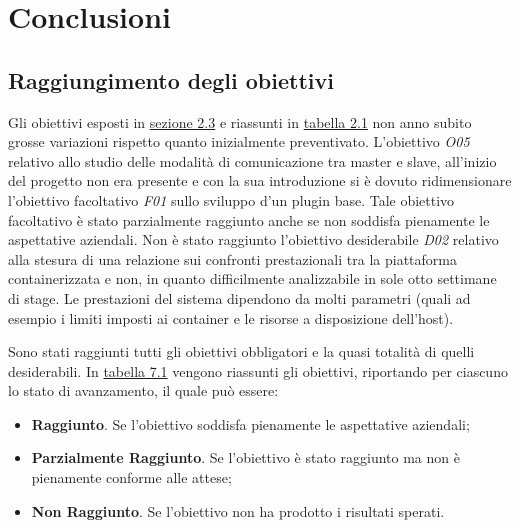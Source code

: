 
\pagestyle{IHA-fancy-style}
\chapter{Conclusioni}
\label{cap:conclusioni}


\section{Raggiungimento degli obiettivi}
\label{sec:obiettivi-raggiunti}

Gli obiettivi esposti in \hyperref[sec:ob]{sezione 2.3} e riassunti in \hyperref[tab:obiettivi-iniziali]{tabella 2.1} non anno subito grosse variazioni rispetto quanto inizialmente preventivato. L'obiettivo \textit{O05} relativo allo studio delle modalità di comunicazione tra \gls{master} e \gls{slave}, all'inizio del progetto non era presente e con la sua introduzione si è dovuto ridimensionare l'obiettivo facoltativo \textit{F01} sullo sviluppo d'un \gls{plugin} base. Tale obiettivo facoltativo è stato parzialmente raggiunto anche se non soddisfa pienamente le aspettative aziendali. Non è stato raggiunto l'obiettivo desiderabile \textit{D02} relativo alla stesura di una relazione sui confronti prestazionali tra la piattaforma containerizzata e non, in quanto difficilmente analizzabile in sole otto settimane di stage. Le prestazioni del sistema dipendono da molti parametri (quali ad esempio i limiti imposti ai \gls{container} e le risorse a disposizione dell'\gls{host}). 

Sono stati raggiunti tutti gli obiettivi obbligatori e la quasi totalità di quelli desiderabili. In \hyperref[tab:obiettivi-ginali]{tabella 7.1} vengono riassunti gli obiettivi, riportando per ciascuno lo stato di avanzamento, il quale può essere:

\begin{itemize}
    \item \textbf{Raggiunto}. Se l'obiettivo soddisfa pienamente le aspettative aziendali;
    \item \textbf{Parzialmente Raggiunto}. Se l'obiettivo è stato raggiunto ma non è pienamente conforme alle attese;
    \item \textbf{Non Raggiunto}. Se l'obiettivo non ha prodotto i risultati sperati.
\end{itemize}

